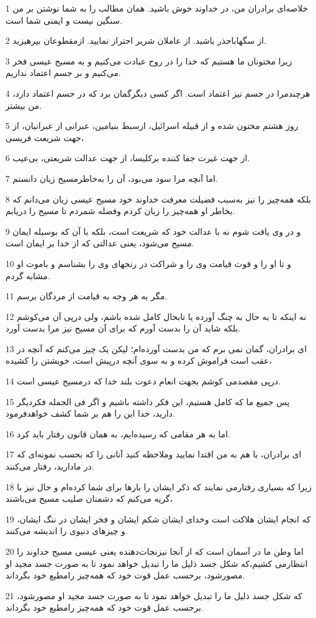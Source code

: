 \par 1 خلاصه‌ای برادران من، در خداوند خوش باشید. همان مطالب را به شما نوشتن بر من سنگین نیست و ایمنی شما است.
\par 2 از سگهاباحذر باشید. از عاملان شریر احتراز نمایید. ازمقطوعان بپرهیزید.
\par 3 زیرا مختونان ما هستیم که خدا را در روح عبادت می‌کنیم و به مسیح عیسی فخر می‌کنیم و بر جسم اعتماد نداریم.
\par 4 هرچندمرا در جسم نیز اعتماد است. اگر کسی دیگرگمان برد که در جسم اعتماد دارد، من بیشتر.
\par 5 روز هشتم مختون شده و از قبیله اسرائیل، ازسبط بنیامین، عبرانی از عبرانیان، از جهت شریعت فریسی،
\par 6 از جهت غیرت جفا کننده برکلیسا، از جهت عدالت شریعتی، بی‌عیب.
\par 7 اما آنچه مرا سود می‌بود، آن را به‌خاطرمسیح زیان دانستم.
\par 8 بلکه همه‌چیز را نیز به‌سبب فضیلت معرفت خداوند خود مسیح عیسی زیان می‌دانم که بخاطر او همه‌چیز را زیان کردم وفضله شمردم تا مسیح را دریابم.
\par 9 و در وی یافت شوم نه با عدالت خود که شریعت است، بلکه با آن که بوسیله ایمان مسیح می‌شود، یعنی عدالتی که از خدا بر ایمان است.
\par 10 و تا او را و قوت قیامت وی را و شراکت در رنجهای وی را بشناسم و باموت او مشابه گردم.
\par 11 مگر به هر وجه به قیامت از مردگان برسم.
\par 12 نه اینکه تا به حال به چنگ آورده یا تابحال کامل شده باشم، ولی در‌پی آن می‌کوشم بلکه شاید آن را بدست آورم که برای آن مسیح نیز مرا بدست آورد.
\par 13 ‌ای برادران، گمان نمی برم که من بدست آورده‌ام؛ لیکن یک چیز می‌کنم که آنچه در عقب است فراموش کرده و به سوی آنچه در‌پیش است، خویشتن را کشیده،
\par 14 در‌پی مقصدمی کوشم بجهت انعام دعوت بلند خدا که درمسیح عیسی است.
\par 15 پس جمیع ما که کامل هستیم، این فکر داشته باشیم و اگر فی الجمله فکردیگر دارید، خدا این را هم بر شما کشف خواهدفرمود.
\par 16 اما به هر مقامی که رسیده‌ایم، به همان قانون رفتار باید کرد.
\par 17 ‌ای برادران، با هم به من اقتدا نمایید وملاحظه کنید آنانی را که بحسب نمونه‌ای که در مادارید، رفتار می‌کنند.
\par 18 زیرا که بسیاری رفتارمی نمایند که ذکر ایشان را بارها برای شما کرده‌ام و حال نیز با گریه می‌کنم که دشمنان صلیب مسیح می‌باشند،
\par 19 که انجام ایشان هلاکت است وخدای ایشان شکم ایشان و فخر ایشان در ننگ ایشان، و چیزهای دنیوی را اندیشه می‌کنند.
\par 20 اما وطن ما در آسمان است که از آنجا نیزنجات‌دهنده یعنی عیسی مسیح خداوند را انتظارمی کشیم،که شکل جسد ذلیل ما را تبدیل خواهد نمود تا به صورت جسد مجید او مصورشود، برحسب عمل قوت خود که همه‌چیز رامطیع خود بگرداند.
\par 21 که شکل جسد ذلیل ما را تبدیل خواهد نمود تا به صورت جسد مجید او مصورشود، برحسب عمل قوت خود که همه‌چیز رامطیع خود بگرداند.


